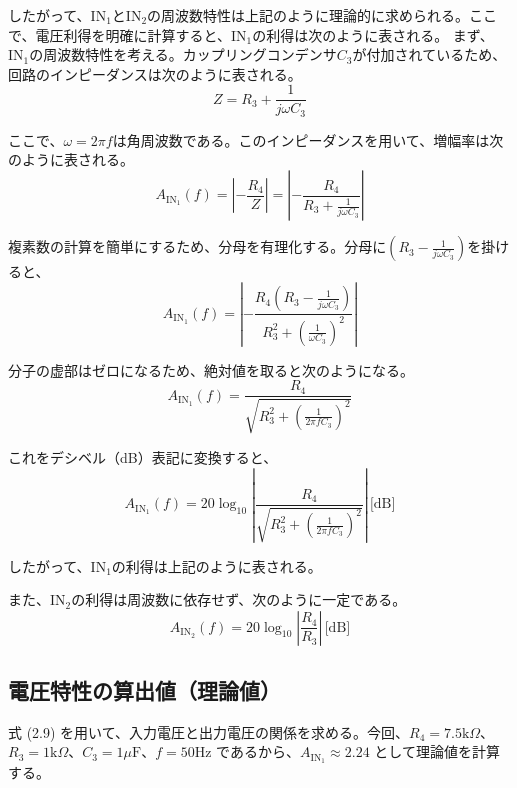 \documentclass{jlreq}
\numberwithin{equation}{section}
\begin{document}
したがって、\(\text{IN}_1\)と\(\text{IN}_2\)の周波数特性は上記のように理論的に求められる。ここで、電圧利得を明確に計算すると、\(\text{IN}_1\)の利得は次のように表される。
まず、\(\text{IN}_1\)の周波数特性を考える。カップリングコンデンサ\(C_3\)が付加されているため、回路のインピーダンスは次のように表される。
\begin{equation}
  Z = R_3 + \frac{1}{j\omega C_3}
\end{equation}

ここで、\(\omega = 2\pi f\)は角周波数である。このインピーダンスを用いて、増幅率は次のように表される。
\begin{equation}
  A_{\text{IN}_1}(f) = \left| -\frac{R_4}{Z} \right| = \left| -\frac{R_4}{R_3 + \frac{1}{j\omega C_3}} \right|
\end{equation}

複素数の計算を簡単にするため、分母を有理化する。分母に\((R_3 - \frac{1}{j\omega C_3})\)を掛けると、
\begin{equation}
  A_{\text{IN}_1}(f) = \left| -\frac{R_4 (R_3 - \frac{1}{j\omega C_3})}{R_3^2 + \left(\frac{1}{\omega C_3}\right)^2} \right|
\end{equation}

分子の虚部はゼロになるため、絶対値を取ると次のようになる。
\begin{equation}
  A_{\text{IN}_1}(f) = \frac{R_4}{\sqrt{R_3^2 + \left(\frac{1}{2\pi f C_3}\right)^2}}
\end{equation}

これをデシベル（dB）表記に変換すると、
\begin{equation}
  A_{\text{IN}_1}(f) = 20 \log_{10} \left| \frac{R_4}{\sqrt{R_3^2 + \left(\frac{1}{2\pi f C_3}\right)^2}} \right| \, \text{[dB]}
\end{equation}

したがって、\(\text{IN}_1\)の利得は上記のように表される。

また、\(\text{IN}_2\)の利得は周波数に依存せず、次のように一定である。
\begin{equation}
  A_{\text{IN}_2}(f) = 20 \log_{10} \left| \frac{R_4}{R_3} \right| \, \text{[dB]}
\end{equation}

\subsection{電圧特性の算出値（理論値）}
式 (2.9) を用いて、入力電圧と出力電圧の関係を求める。今回、\(R_4 = 7.5\text{k}\Omega\)、\(R_3 = 1\text{k}\Omega\)、\(C_3 = 1\mu\text{F}\)、\(f = 50\text{Hz}\) であるから、\(A_{\text{IN}_1} \approx 2.24\) として理論値を計算する。
\end{document}
